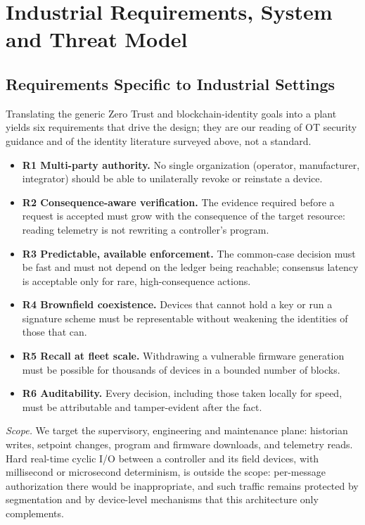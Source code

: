 \section{Industrial Requirements, System and Threat Model}\label{sec:model}

\subsection{Requirements Specific to Industrial Settings}\label{sec:reqs}
Translating the generic Zero Trust and blockchain-identity goals into a plant yields six requirements that drive the design; they are our reading of OT security guidance \cite{stouffer2023sp80082} and of the identity literature surveyed above, not a standard.
\begin{itemize}[leftmargin=1.1em,itemsep=0pt,topsep=1pt]
  \item \textbf{R1 Multi-party authority.} No single organization (operator, manufacturer, integrator) should be able to unilaterally revoke or reinstate a device.
  \item \textbf{R2 Consequence-aware verification.} The evidence required before a request is accepted must grow with the consequence of the target resource: reading telemetry is not rewriting a controller's program.
  \item \textbf{R3 Predictable, available enforcement.} The common-case decision must be fast and must not depend on the ledger being reachable; consensus latency is acceptable only for rare, high-consequence actions.
  \item \textbf{R4 Brownfield coexistence.} Devices that cannot hold a key or run a signature scheme must be representable without weakening the identities of those that can.
  \item \textbf{R5 Recall at fleet scale.} Withdrawing a vulnerable firmware generation must be possible for thousands of devices in a bounded number of blocks.
  \item \textbf{R6 Auditability.} Every decision, including those taken locally for speed, must be attributable and tamper-evident after the fact.
\end{itemize}
\emph{Scope.} We target the supervisory, engineering and maintenance plane: historian writes, setpoint changes, program and firmware downloads, and telemetry reads. Hard real-time cyclic I/O between a controller and its field devices, with millisecond or microsecond determinism, is outside the scope: per-message authorization there would be inappropriate, and such traffic remains protected by segmentation and by device-level mechanisms that this architecture only complements.

